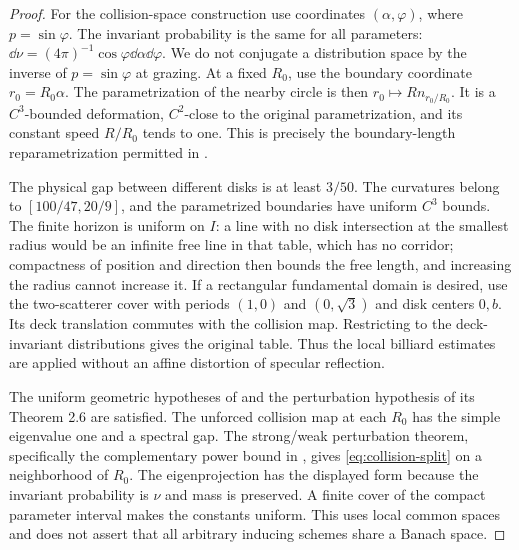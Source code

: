 \begin{proof}
For the collision-space construction use coordinates $(\alpha,\varphi)$,
where $p=\sin\varphi$. The invariant probability is the same for all
parameters: $\dd\nu=(4\pi)^{-1}\cos\varphi\dd\alpha\dd\varphi$.
We do not conjugate a distribution space by the inverse of
$p=\sin\varphi$ at grazing. At a fixed $R_0$, use the boundary coordinate
$r_0=R_0\alpha$. The parametrization of the nearby circle is then
$r_0\mapsto R n_{r_0/R_0}$. It is a $C^3$-bounded deformation, $C^2$-close
to the original parametrization, and its constant speed $R/R_0$ tends to
one. This is precisely the boundary-length reparametrization permitted in
\cite[Remark 2.7(b)]{DZ}.

The physical gap between different disks is at least $3/50$. The
curvatures belong to $[100/47,20/9]$, and the parametrized boundaries have
uniform $C^3$ bounds. The finite horizon is uniform on $I$: a line with
no disk intersection at the smallest radius would be an infinite free
line in that table, which has no corridor; compactness of position and
direction then bounds the free length, and increasing the radius cannot
increase it. If a rectangular fundamental domain is desired, use the
two-scatterer cover with periods $(1,0)$ and $(0,\sqrt3)$ and disk centers
$0,b$. Its deck translation commutes with the collision map. Restricting
to the deck-invariant distributions gives the original table. Thus the
local billiard estimates are applied without an affine distortion of
specular reflection.

The uniform geometric hypotheses of \cite[Theorem 2.5]{DZ} and the
perturbation hypothesis of its Theorem 2.6 are satisfied. The unforced
collision map at each $R_0$ has the simple eigenvalue one and a spectral
gap. The strong/weak perturbation theorem, specifically the complementary
power bound in \cite[Theorem 2.1(3)]{DZ}, gives \eqref{eq:collision-split}
on a neighborhood of $R_0$. The eigenprojection has the displayed form
because the invariant probability is $\nu$ and mass is preserved. A
finite cover of the compact parameter interval makes the constants
uniform. This uses local common spaces and does not assert that all
arbitrary inducing schemes share a Banach space.


\end{proof}
